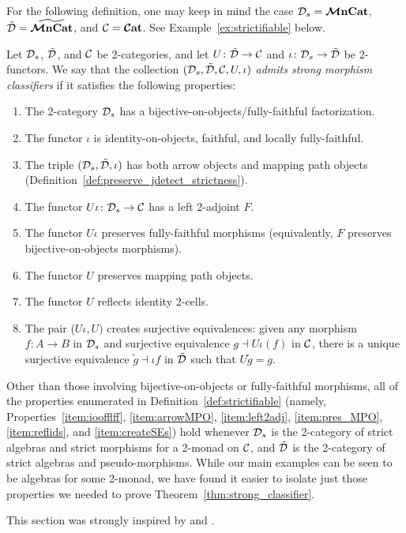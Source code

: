\documentclass[11pt,oneside,article]{memoir}
\begin{document}
For the following definition, one may keep in mind the case $\mathcal{D}_s=\bm{\mathcal{M}}\mathbf{nCat}$, $\tilde{\mathcal{D}}=\widetilde{\bm{\mathcal{M}}\mathbf{nCat}}$, and $\mathcal{C}=\bm{\mathcal{C}}\mathbf{at}$. See Example~\ref{ex:strictifiable} below.


\begin{definition}\label{def:strictifiable}
Let $\mathcal{D}_s$, $\tilde{\mathcal{D}}$, and $\mathcal{C}$ be 2-categories, and let $U\colon\tilde{\mathcal{D}}\to\mathcal{C}$ and $\iota\colon\mathcal{D}_s\to\tilde{\mathcal{D}}$ be 2-functors. We say that the collection $(\mathcal{D}_s,\tilde{\mathcal{D}},\mathcal{C},U,\iota)$ \emph{admits strong morphism classifiers} if it satisfies the following properties:
\begin{enumerate}
 \item\label{item:boff} 
   The 2-category $\mathcal{D}_s$ has a bijective-on-objects/fully-faithful factorization.
 \item\label{item:ioofflff} 
   The functor $\iota$ is identity-on-objects, faithful, and locally fully-faithful.
 \item\label{item:arrowMPO}
   The triple $(\mathcal{D}_s,\tilde{\mathcal{D}},\iota)$ has both arrow objects and mapping path objects
   (Definition~\ref{def:preserve_jdetect_strictness}).
 \item\label{item:left2adj}
   The functor $U\iota\colon\mathcal{D}_s\to\mathcal{C}$ has a left 2-adjoint $F$.
 \item\label{item:pres_ff}
   The functor $U\iota$ preserves fully-faithful morphisms (equivalently, $F$ preserves
   bijective-on-objects morphisms).
 \item\label{item:pres_MPO}
   The functor $U$ preserves mapping path objects.
 \item\label{item:reflids}
   The functor $U$ reflects identity 2-cells.
 \item\label{item:createSEs}
   The pair ($U\iota,U)$ creates surjective equivalences: given any morphism $f\colon A\to B$
   in $\mathcal{D}_s$ and surjective equivalence $g\dashv U\iota(f)$ in $\mathcal{C}$, there is a unique
   surjective equivalence $\tilde{g}\dashv\iota f$ in $\tilde{\mathcal{D}}$ such that $U\tilde{g}=g$.
\end{enumerate}

\end{definition}

\begin{remark}
   Other than those involving bijective-on-objects or fully-faithful morphisms, all of the
   properties enumerated in Definition~\ref{def:strictifiable} (namely,
   Properties~\ref{item:ioofflff}, \ref{item:arrowMPO}, \ref{item:left2adj}, \ref{item:pres_MPO},
   \ref{item:reflids}, and \ref{item:createSEs}) hold whenever $\mathcal{D}_s$ is the 2-category of
   strict algebras and strict morphisms for a 2-monad on $\mathcal{C}$, and $\tilde{\mathcal{D}}$ is the
   2-category of strict algebras and pseudo-morphisms. While our main examples can be seen to be
   algebras for some 2-monad, we have found it easier to isolate just those properties we needed to
   prove Theorem~\ref{thm:strong_classifier}.

   This section was strongly inspired by \cite{Bourke} and \cite{LackHomotopy}.
\end{remark}
\end{document}
